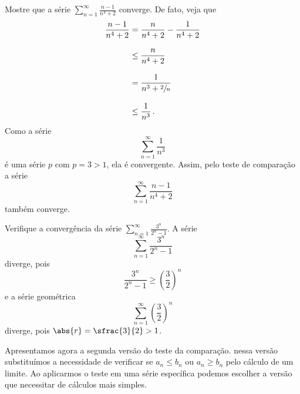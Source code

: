 
\begin{example}
  Mostre que a série \(\sum_{n=1}^\infty \frac{n-1}{n^4+2}\) converge.
  \solution
  De fato, veja que
  \begin{align*}
    \frac{n-1}{n^4+2} & =    \frac{n}{n^4+2} - \frac{1}{n^4+2} \\[3mm]
                      & \leq \frac{n}{n^4+2}                   \\[3mm]
                      & =    \frac{1}{n^3 + \sfrac{2}{n}}      \\[3mm]
                      & \leq \frac{1}{n^3}                     \,.
  \end{align*}
  Como a série
  \[
    \sum_{n=1}^\infty \frac{1}{n^3}
  \]
  é uma série $p$ com $p=3>1$, ela é convergente.
  Assim, pelo teste de comparação a série
  \[
    \sum_{n=1}^\infty \frac{n-1}{n^4+2}
  \]
  também converge.
\end{example}

\begin{example}
  Verifique a convergência da série
  \(
    \sum_{n=1}^\infty\frac{3^n}{2^n-1}
  \).
  \solution
  A série
  \[
    \sum_{n=1}^\infty\frac{3^n}{2^n-1}
  \]
  diverge, pois
  \[
    \frac{3^n}{2^n-1}\geq \left(\frac{3}{2}\right)^n
  \]
  e a série geométrica
  \[
    \sum_{n=1}^\infty\left(\frac{3}{2}\right)^n
  \]
  diverge, pois
  \(
    \abs{r}=\sfrac{3}{2}>1
  \).
\end{example}

Apresentamos agora a segunda versão do teste da comparação. nessa versão substituímos
a necessidade de verificar se $a_n\leq b_n$ ou $a_n\geq b_n$ pelo cálculo de um
limite. Ao aplicarmos o teste em uma série específica podemos escolher a versão
que necessitar de cálculos mais simples.

